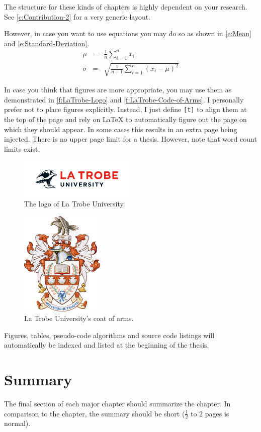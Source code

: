 The structure for these kinds of chapters is highly dependent on your research. See \autoref{c:Contribution-2} for a very generic layout.

However, in case you want to use equations you may do so as shown in \autoref{e:Mean} and \autoref{e:Standard-Deviation}.
\begin{eqnarray}
\mu    &=& \frac{1}{n} \sum_{i=1}^{n} x_i
\label{e:Mean} \\
\sigma &=& \sqrt{\frac{1}{n - 1} \sum_{i=1}^{n} (x_i - \mu)^2}
\label{e:Standard-Deviation}
\end{eqnarray}

In case you think that figures are more appropriate, you may use them as demonstrated in \autoref{f:LaTrobe-Logo} and \autoref{f:LaTrobe-Code-of-Arms}. I personally prefer not to place figures explicitly. Instead, I just define \texttt{[t]} to align them at the top of the page and rely on \LaTeX{} to automatically figure out the page on which they should appear. In some cases this results in an extra page being injected. There is no upper page limit for a thesis. However, note that word count limits exist.

\begin{figure}[t]
\centering
\includegraphics[width=0.5\textwidth]{figures/latrobe-logo}
\caption{The logo of La Trobe University.}
\label{f:LaTrobe-Logo}
\end{figure}

\begin{figure}[t]
\centering
\includegraphics[width=4cm]{figures/latrobe-coat-of-arms}
\caption{La Trobe University's coat of arms.}
\label{f:LaTrobe-Code-of-Arms}
\end{figure}

Figures, tables, pseudo-code algorithms and source code listings will automatically be indexed and listed at the beginning of the thesis.


\section{Summary}
\label{s:Contribution-1-Summary}

The final section of each major chapter should summarize the chapter. In comparison to the chapter, the summary should be short ($\frac{1}{2}$ to $2$ pages is normal).